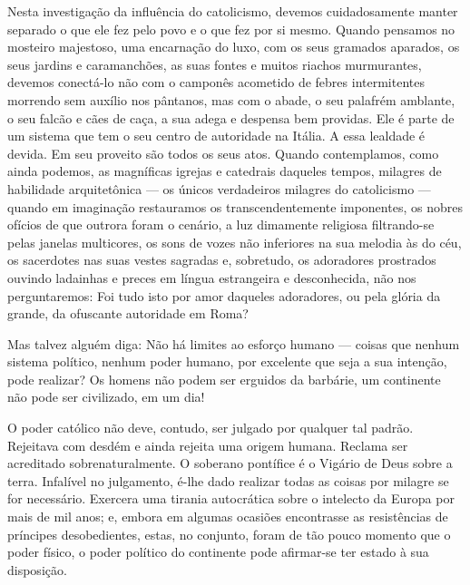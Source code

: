 \documentclass[11pt,a5paper,twoside,openany]{book}
\begin{document}
Nesta investigação da influência do catolicismo, devemos cuidadosamente manter separado o que ele fez pelo povo e o que fez por si mesmo. Quando pensamos no mosteiro majestoso, uma encarnação do luxo, com os seus gramados aparados, os seus jardins e caramanchões, as suas fontes e muitos riachos murmurantes, devemos conectá-lo não com o camponês acometido de febres intermitentes morrendo sem auxílio nos pântanos, mas com o abade, o seu palafrém amblante, o seu falcão e cães de caça, a sua adega e despensa bem providas. Ele é parte de um sistema que tem o seu centro de autoridade na Itália. A essa lealdade é devida. Em seu proveito são todos os seus atos. Quando contemplamos, como ainda podemos, as magníficas igrejas e catedrais daqueles tempos, milagres de habilidade arquitetônica — os únicos verdadeiros milagres do catolicismo — quando em imaginação restauramos os transcendentemente imponentes, os nobres ofícios de que outrora foram o cenário, a luz dimamente religiosa filtrando-se pelas janelas multicores, os sons de vozes não inferiores na sua melodia às do céu, os sacerdotes nas suas vestes sagradas e, sobretudo, os adoradores prostrados ouvindo ladainhas e preces em língua estrangeira e desconhecida, não nos perguntaremos: Foi tudo isto por amor daqueles adoradores, ou pela glória da grande, da ofuscante autoridade em Roma?

Mas talvez alguém diga: Não há limites ao esforço humano — coisas que nenhum sistema político, nenhum poder humano, por excelente que seja a sua intenção, pode realizar? Os homens não podem ser erguidos da barbárie, um continente não pode ser civilizado, em um dia!

O poder católico não deve, contudo, ser julgado por qualquer tal padrão. Rejeitava com desdém e ainda rejeita uma origem humana. Reclama ser acreditado sobrenaturalmente. O soberano pontífice é o Vigário de Deus sobre a terra. Infalível no julgamento, é-lhe dado realizar todas as coisas por milagre se for necessário. Exercera uma tirania autocrática sobre o intelecto da Europa por mais de mil anos; e, embora em algumas ocasiões encontrasse as resistências de príncipes desobedientes, estas, no conjunto, foram de tão pouco momento que o poder físico, o poder político do continente pode afirmar-se ter estado à sua disposição.
\end{document}
